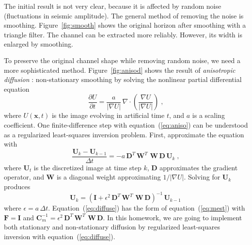
The initial result is not very clear, because it is affected by random
noise (fluctuations in seismic amplitude). The general method of
removing the noise is smoothing. Figure~\ref{fig:smooth} shows the
original horizon after smoothing with a triangle filter. The channel
can be extracted more reliably. However, its width is enlarged by smoothing.


To preserve the original channel shape while removing random noise, we
need a more sophisticated method. Figure~\ref{fig:anisod} shows
the result of \emph{anisotropic diffusion} \cite[]{weickert}:
non-stationary smoothing by solving the nonlinear partial differential equation
\begin{equation}
\label{eq:aniso}
\frac{\partial U}{\partial t} = \frac{a}{|\nabla U|}\,\nabla \cdot \left(\frac{\nabla U}{|\nabla U|}\right)\;,
\end{equation}
where $U(\mathbf{x},t)$ is the image evolving in artificial time $t$,
and $a$ is a scaling coefficient. One finite-difference step with
equation~(\ref{eq:aniso}) can be understood as a regularized
least-squares inversion problem. First, approximate the equation with
\begin{equation}
\label{eq:aniso}
\frac{\mathbf{U}_k-\mathbf{U}_{k-1}}{\Delta t} = - a\,\mathbf{D}^T\,\mathbf{W}^T\,\,\mathbf{W}\,\mathbf{D}\,\mathbf{U}_k\;,
\end{equation}
where $\mathbf{U}_t$ is the discretized image at time step $k$,
$\mathbf{D}$ approximates the gradient operator, and $\mathbf{W}$ is a
diagonal weight approximating $1/|\nabla U|$. Solving for $\mathbf{U}_k$ produces
\begin{equation}
\label{eq:diffuse}
\mathbf{U}_k = \left(\mathbf{I} + \epsilon^2\,\mathbf{D}^T\,\mathbf{W}^T\,\,\mathbf{W}\,\mathbf{D}\right)^{-1}\,\mathbf{U}_{k-1}\,
\end{equation}
where $\epsilon=a\,\Delta t$. Equation~(\ref{eq:diffuse}) has the form
of equation~(\ref{eq:mest}) with $\mathbf{F}=\mathbf{I}$ and
$\mathbf{C}_m^{-1} =
\epsilon^2\,\mathbf{D}^T\,\mathbf{W}^T\,\,\mathbf{W}\,\mathbf{D}$. In this homework, we are going to implement both stationary and
non-stationary diffusion by regularized least-squares inversion with
equation~(\ref{eq:diffuse}).

